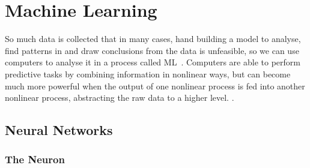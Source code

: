 
\chapter{Machine Learning}

So much data is collected that in many cases, hand building a model to analyse, find patterns in and draw conclusions from the data is unfeasible, so we can use computers to analyse it in a process called \ac{ML}~\autocite[1]{murphy2012}.
Computers are able to perform predictive tasks by combining information in nonlinear ways, but can become much more powerful when the output of one nonlinear process is fed into another nonlinear process, abstracting the raw data to a higher level.
.

\section{Neural Networks}

\subsection{The Neuron}


